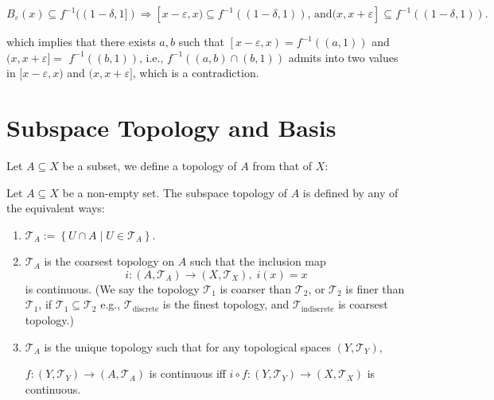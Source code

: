 \begin{example}
\begin{example}
\[
{B}_{\varepsilon}\left(x\right)  \subseteq  {f}^{-1}(\left({1 - \delta,1\rbrack}\right)  \Rightarrow  \left\lbrack  {x - \varepsilon,x) \subseteq  {f}^{-1}\left(\left({1 - \delta,1}\right) \right) \text{, and}(x,x + \varepsilon}\right\rbrack   \subseteq  {f}^{-1}\left(\left({1 - \delta,1}\right) \right) \text{.}
\]

which implies that there exists \(a,b\) such that \(\left\lbrack  {x - \varepsilon,x}\right)  = {f}^{-1}\left(\left({a,1}\right) \right)\) and \((x,x + \varepsilon \rbrack  =\)  \({f}^{-1}\left(\left({b,1}\right) \right)\), i.e., \({f}^{-1}\left({\left({a,b}\right)  \cap  \left({b,1}\right)}\right)\) admits into two values in \(\lbrack x - \varepsilon,x)\) and \((x,x + \varepsilon \rbrack\), which is a contradiction.
\end{example}

\section{Subspace Topology and Basis}
Let $A \subseteq X$ be a subset, we define a topology of $A$ from that of $X$:
\begin{definition} \label{def:subspace_topology} Let \(A \subseteq  X\) be a non-empty set. The subspace topology of \(A\) is defined by any of the equivalent ways:
\begin{enumerate}
\item \({\mathcal{T}}_{A} := \left\{  {U \cap  A \mid  U \in  {\mathcal{T}}_{A}}\right\}.\)
\item $\mathcal{T}_A$ is the coarsest topology on \(A\) such that the inclusion map
\[
i : \left({A,{\mathcal{T}}_{A}}\right)  \rightarrow  \left({X,{\mathcal{T}}_X}\right),\;i\left(x\right)  = x
\]
is continuous. (We say the topology \({\mathcal{T}}_{1}\) is coarser than \({\mathcal{T}}_{2}\), or \({\mathcal{T}}_{2}\) is finer than \({\mathcal{T}}_{1}\), if \({\mathcal{T}}_{1} \subseteq  {\mathcal{T}}_{2}\) e.g., \({\mathcal{T}}_{\text{discrete}}\) is the finest topology, and \({\mathcal{T}}_{\text{indiscrete}}\) is coarsest topology.)

\item $\mathcal{T}_A$ is the unique topology such that for any topological spaces \(\left({Y,{\mathcal{T}}_Y}\right)\),
\begin{center}
$f : \left({Y,{\mathcal{T}}_Y}\right)  \rightarrow  \left({A,{\mathcal{T}}_{A}}\right)$ is continuous iff \(i \circ  f : \left({Y,{\mathcal{T}}_Y}\right)  \rightarrow  \left({X,{\mathcal{T}}_X}\right)\) is continuous.
\end{center}
\end{enumerate}
\end{definition}


\end{example}

